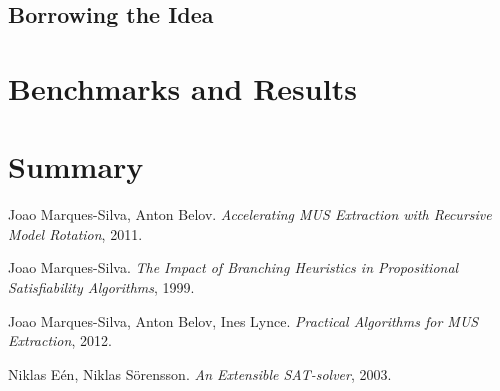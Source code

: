 \documentclass[]{article}
\begin{document}
	\subsection{Borrowing the Idea}
	
	\section{Benchmarks and Results}
	
	\section{Summary}
	
	\pagebreak
	\begin{thebibliography}{9}
		
			Joao Marques-Silva,
			Anton Belov.
			\textit{Accelerating MUS Extraction with Recursive Model Rotation},
			2011.
			
			Joao Marques-Silva.
			\textit{The Impact of Branching Heuristics in Propositional Satisfiability Algorithms},
			1999.
			
			Joao Marques-Silva,
			 Anton Belov,
			 Ines Lynce.
			\textit{Practical Algorithms for MUS Extraction},
			2012.
			
			Niklas Eén,
			Niklas Sörensson.
			\textit{An Extensible SAT-solver},
			2003.
			
		
		
	\end{thebibliography}
\end{document}
